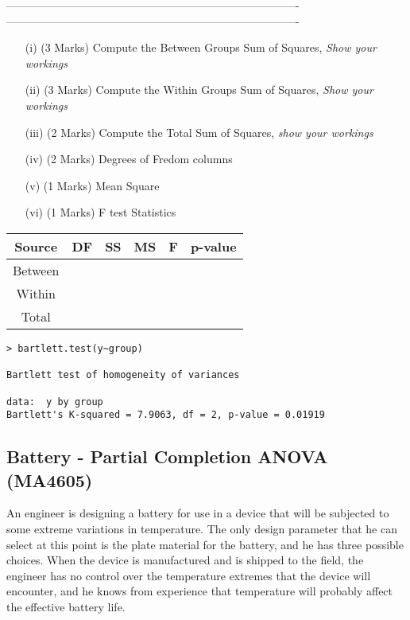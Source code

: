 -------------------------------------------------------------------------------
-------------------------------------------------------------------------------



\begin{itemize}
	\item[(i)](3 Marks) Compute the Between Groups Sum of Squares, \textit{Show your workings}
	\item[(ii)](3 Marks) Compute the Within Groups Sum of Squares, \textit{Show your workings}
	\item[(iii)](2 Marks) Compute the Total Sum of Squares,\textit{ show your workings}
	\item[(iv)] (2 Marks) Degrees of Fredom columns
	\item[(v)] (1 Marks) Mean Square
	\item[(vi)] (1 Marks) F test Statistics
\end{itemize}
\begin{tabular}{|c|c|c|c|c|c|}
	\hline Source & DF & SS & MS & F & p-value \\ 
	\hline Between &  &  &  &  &  \\ 
	\hline Within &  &  &  &  &  \\ 
	\hline Total &  &  &  &  &  \\ 
	\hline 
\end{tabular} 
\begin{framed}
\begin{verbatim}
> bartlett.test(y~group)

Bartlett test of homogeneity of variances

data:  y by group
Bartlett's K-squared = 7.9063, df = 2, p-value = 0.01919

\end{verbatim}
\end{framed}

\subsection{Battery - Partial Completion ANOVA (MA4605)}

An engineer is designing a battery for use in a device that will be subjected to some extreme variations in temperature. 
The only design parameter that he can select at this point is the plate material for the battery, and he has three possible choices. 
When the device is manufactured and is shipped to the field, the engineer has no control over the temperature extremes that the device will encounter, and he knows from experience 
that temperature will probably affect the effective battery life. 

